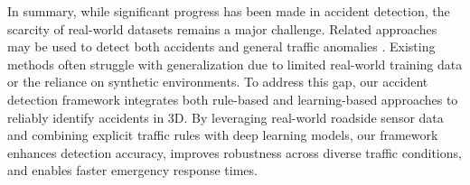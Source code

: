 In summary, while significant progress has been made in accident detection, the scarcity of real-world datasets remains a major challenge. 
Related approaches may be used to detect both accidents and general traffic anomalies \cite{greer2024towards, greer2023pedestrian}. 
Existing methods often struggle with generalization due to limited real-world training data or the reliance on synthetic environments. To address this gap, our accident detection framework integrates both rule-based and learning-based approaches to reliably identify accidents in 3D. By leveraging real-world roadside sensor data and combining explicit traffic rules with deep learning models, our framework enhances detection accuracy, improves robustness across diverse traffic conditions, and enables faster emergency response times.
